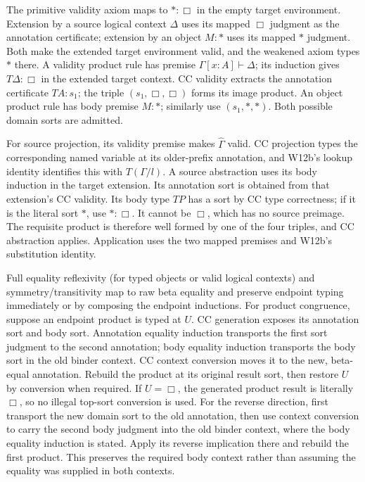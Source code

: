 The primitive validity axiom maps to \(\ast:\Box\) in the empty
target environment. Extension by a source logical context \(\Delta\)
uses its mapped \(\Box\) judgment as the annotation certificate;
extension by an object \(M:\ast\) uses its mapped \(\ast\)
judgment. Both make the extended target environment valid, and the
weakened axiom types \(\ast\) there. A validity product rule has
premise \(\Gamma[x:A]\vdash\Delta\); its induction gives
\(T\Delta:\Box\) in the extended target context. CC validity
extracts the annotation certificate \(TA:s_1\); the triple
\((s_1,\Box,\Box)\) forms its image product. An object product rule
has body premise \(M:\ast\); similarly use
\((s_1,\ast,\ast)\). Both possible domain sorts are admitted.

For source projection, its validity premise makes
\(\widehat\Gamma\) valid. CC projection types the corresponding
named variable at its older-prefix annotation, and W12b's lookup
identity identifies this with \(T(\Gamma/l)\). A source abstraction
uses its body induction in the target extension. Its annotation sort
is obtained from that extension's CC validity. Its body type \(TP\)
has a sort by CC type correctness; if it is the literal sort \(\ast\),
use \(\ast:\Box\). It cannot be \(\Box\), which has no source
preimage. The requisite product is therefore well formed by one of
the four triples, and CC abstraction applies. Application uses the
two mapped premises and W12b's substitution identity.

Full equality reflexivity (for typed objects or valid logical contexts)
and symmetry/transitivity map to raw beta equality and preserve endpoint
typing immediately or by composing the endpoint inductions. For product
congruence, suppose an endpoint product is typed at \(U\). CC generation
exposes its annotation sort and body sort. Annotation equality induction
transports the first sort judgment to the second annotation; body
equality induction transports the body sort in the old binder context.
CC context conversion moves it to the new, beta-equal annotation.
Rebuild the product at its original result sort, then restore \(U\)
by conversion when required. If \(U=\Box\), the generated product
result is literally \(\Box\), so no illegal top-sort conversion is
used. For the reverse direction, first transport the new domain sort
to the old annotation, then use context conversion to carry the
second body judgment into the old binder context, where the body
equality induction is stated. Apply its reverse implication there
and rebuild the first product. This preserves the required body
context rather than assuming the equality was supplied in both contexts.

